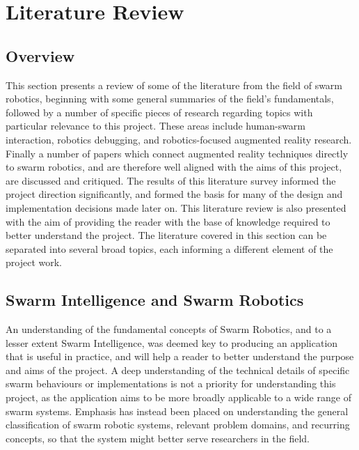 
\chapter[Literature Review]{Literature Review} %

\label{Chapter2} %


\section{Overview}
This section presents a review of some of the literature from the field of swarm robotics, beginning with some general summaries of the field's fundamentals, followed by a number of specific pieces of research regarding topics with particular relevance to this project. These areas include human-swarm interaction, robotics debugging, and robotics-focused augmented reality research. Finally a number of papers which connect augmented reality techniques directly to swarm robotics, and are therefore well aligned with the aims of this project, are discussed and critiqued. The results of this literature survey informed the project direction significantly, and formed the basis for many of the design and implementation decisions made later on. This literature review is also presented with the aim of providing the reader with the base of knowledge required to better understand the project. The literature covered in this section can be separated into several broad topics, each informing a different element of the project work.


\section{Swarm Intelligence and Swarm Robotics} \label{GeneralSwarmRobotics}
An understanding of the fundamental concepts of Swarm Robotics, and to a lesser extent Swarm Intelligence, was deemed key to producing an application that is useful in practice, and will help a reader to better understand the purpose and aims of the project. A deep understanding of the technical details of specific swarm behaviours or implementations is not a priority for understanding this project, as the application aims to be more broadly applicable to a wide range of swarm systems. Emphasis has instead been placed on understanding the general classification of swarm robotic systems, relevant problem domains, and recurring concepts, so that the system might better serve researchers in the field.

